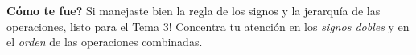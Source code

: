 \documentclass[12pt, letterpaper]{article}
\begin{document}
  \vspace{10pt}
  \begin{cuadrosolucion}
    \textbf{\textquestiondown Cómo te fue?} Si manejaste bien la regla de los signos y la jerarquía de las operaciones, \textquestiondown listo para el Tema 3! Concentra tu atención en los \emph{signos dobles} y en el \emph{orden} de las operaciones combinadas.
  \end{cuadrosolucion}

\fi
\end{document}
